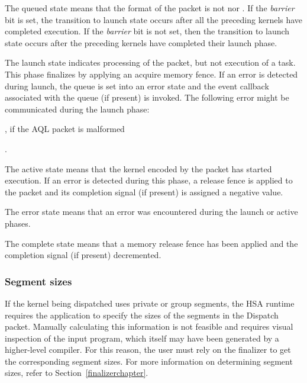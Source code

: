 \documentclass[final]{book}
\newcommand{\reffld}[1]{\textit{#1}}
\begin{document}
\begin{description}[leftmargin=0cm, labelindent=0cm]
\item[Queued] The queued state means that the format of the packet is not
   nor
  .  If the \reffld{barrier} bit is set, 
  the transition to launch state occurs after all the preceding kernels have 
  completed execution. If the \reffld{barrier} bit is not set, then the 
  transition to launch state occurs after the preceding kernels have completed 
  their launch phase.

\item[Launch] The launch state indicates processing of the packet, but not
  execution of a task. This phase finalizes by applying an acquire memory fence.
  If an error is detected during launch, the queue is set into an error state
  and the event callback associated with the queue (if present) is invoked. The
  following error might be communicated during the launch
  phase:\begin{inparaenum}[a\upshape)]\item
    , if the AQL packet is
    malformed\end{inparaenum}.

\item[Active] The active state means that the kernel encoded by the packet 
  has started execution. If an error is detected during this phase, a release 
  fence is applied to the packet and its completion signal (if present) is 
  assigned a negative value.

\item[Error] The error state means that an error was encountered during the 
  launch or active phases.

\item[Complete] The complete state means that a memory release fence has been
  applied and the completion signal (if present) decremented.
\end{description}

\subsubsection{Segment sizes}\label{segment-sizes}

If the kernel being dispatched uses private or group segments, the HSA runtime 
requires the application to specify the sizes of the segments in the Dispatch
packet. Manually calculating this information is not feasible and requires
visual inspection of the input program, which itself may have been generated by a
higher-level compiler. For this reason, the user must rely on the finalizer to get the
corresponding segment sizes. For more information on determining segment sizes, 
refer to Section~\ref{finalizerchapter}.
\end{document}

